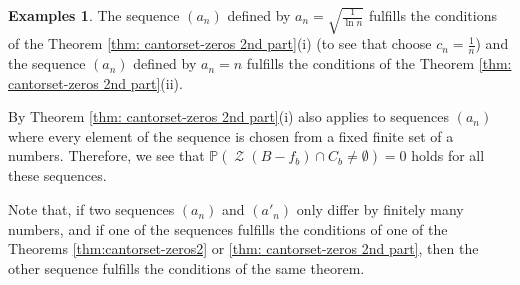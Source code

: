 \documentclass[11pt,reqno]{amsart}
\theoremstyle{plain}
\theoremstyle{definition}
\newtheorem{examples}[theorem]{Examples}
\theoremstyle{remark}
\begin{document}
\begin{examples}
The sequence $(a_n)$ defined by $a_n = \sqrt{\frac{1}{\ln{n}}}$ fulfills the conditions of the Theorem \ref{thm: cantorset-zeros 2nd part}(i) (to see that choose $c_n= \frac{1}{n}$) and the sequence $(a_n)$ defined by $a_n = n$ fulfills the conditions of the Theorem \ref{thm: cantorset-zeros 2nd part}(ii).

By Theorem \ref{thm: cantorset-zeros 2nd part}(i) also applies to sequences $(a_n)$ where every element of the sequence is chosen from a fixed finite set of a numbers. Therefore, we see that $\mathbb{P}(\operatorname{\mathcal{Z}}(B-f_b) \cap C_b \neq \emptyset)=0$ holds for all these sequences.
\end{examples}

Note that, if two sequences $(a_n)$ and $(a'_n)$ only differ by finitely many numbers, and if one of the sequences fulfills the conditions of one of the Theorems \ref{thm:cantorset-zeros2} or \ref{thm: cantorset-zeros 2nd part}, then the other sequence fulfills the conditions of the same theorem.
\end{document}
